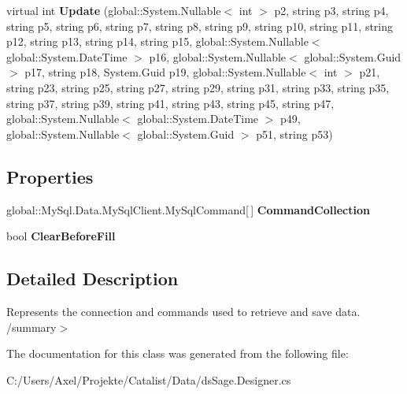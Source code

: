 \begin{DoxyCompactItemize}
\item 
virtual int {\bfseries Update} (global\+::\+System.\+Nullable$<$ int $>$ p2, string p3, string p4, string p5, string p6, string p7, string p8, string p9, string p10, string p11, string p12, string p13, string p14, string p15, global\+::\+System.\+Nullable$<$ global\+::\+System.\+Date\+Time $>$ p16, global\+::\+System.\+Nullable$<$ global\+::\+System.\+Guid $>$ p17, string p18, System.\+Guid p19, global\+::\+System.\+Nullable$<$ int $>$ p21, string p23, string p25, string p27, string p29, string p31, string p33, string p35, string p37, string p39, string p41, string p43, string p45, string p47, global\+::\+System.\+Nullable$<$ global\+::\+System.\+Date\+Time $>$ p49, global\+::\+System.\+Nullable$<$ global\+::\+System.\+Guid $>$ p51, string p53)\hypertarget{class_products_1_1_data_1_1ds_sage_table_adapters_1_1ta_interessent_ab075ef6616d2147fcc9de39897883ebf}{}\label{class_products_1_1_data_1_1ds_sage_table_adapters_1_1ta_interessent_ab075ef6616d2147fcc9de39897883ebf}

\end{DoxyCompactItemize}
\subsection*{Properties}
\begin{DoxyCompactItemize}
\item 
global\+::\+My\+Sql.\+Data.\+My\+Sql\+Client.\+My\+Sql\+Command\mbox{[}$\,$\mbox{]} {\bfseries Command\+Collection}\hypertarget{class_products_1_1_data_1_1ds_sage_table_adapters_1_1ta_interessent_a1a121bbe017e2529cf79621b2b8debd4}{}\label{class_products_1_1_data_1_1ds_sage_table_adapters_1_1ta_interessent_a1a121bbe017e2529cf79621b2b8debd4}

\item 
bool {\bfseries Clear\+Before\+Fill}\hypertarget{class_products_1_1_data_1_1ds_sage_table_adapters_1_1ta_interessent_aefe31071a9b204fd1612eaf9799b9a79}{}\label{class_products_1_1_data_1_1ds_sage_table_adapters_1_1ta_interessent_aefe31071a9b204fd1612eaf9799b9a79}

\end{DoxyCompactItemize}


\subsection{Detailed Description}
Represents the connection and commands used to retrieve and save data. /summary$>$ 

The documentation for this class was generated from the following file\+:\begin{DoxyCompactItemize}
\item 
C\+:/\+Users/\+Axel/\+Projekte/\+Catalist/\+Data/ds\+Sage.\+Designer.\+cs\end{DoxyCompactItemize}
